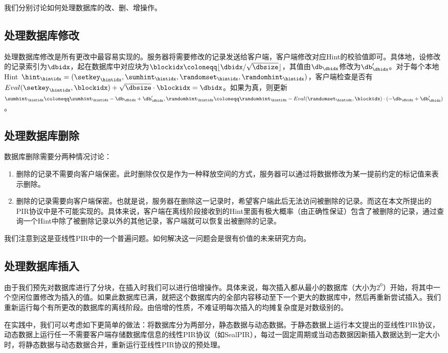 我们分别讨论如何处理数据库的改、删、增操作。

\subsection{处理数据库修改}
处理数据库修改是所有更改中最容易实现的。服务器将需要修改的记录发送给客户端，客户端修改对应Hint的校验值即可。具体地，设修改的记录索引为$\dbidx$，起在数据库中对应块为$\blockidx\coloneqq \lfloor \dbidx/\sqrt{\dbsize}\rfloor$，其值由$\db_\dbidx$修改为$\db_\dbidx'$。对于每个本地Hint $\hint_\hintidx = (\setkey_\hintidx,\sumhint_\hintidx,\randomset_\hintidx,\randomhint_\hintidx)$，客户端检查是否有 $Eval(\setkey_\hintidx, \blockidx) + \sqrt{\dbsize}\cdot \blockidx = \dbidx $。如果为真，则更新$\sumhint_\hintidx \coloneqq \sumhint_\hintidx - \db_{\dbidx} + \db_{\dbidx}', \randomhint_\hintidx \coloneqq \randomhint_\hintidx - Eval(\randomset_\hintidx,\blockidx)\cdot(-\db_{\dbidx} + \db_{\dbidx}')$。

\subsection{处理数据库删除}
数据库删除需要分两种情况讨论：
\begin{enumerate}
    \item 删除的记录不需要向客户端保密。此时删除仅仅是作为一种释放空间的方式，服务器可以通过将数据修改为某一提前约定的标记值来表示删除。
    \item 删除的记录需要向客户端保密。也就是说，服务器在删除这一记录时，希望客户端此后无法访问被删除的记录。而这在本文所提出的PIR协议中是不可能实现的。具体来说，客户端在离线阶段接收到的Hint里面有极大概率（由正确性保证）包含了被删除的记录，通过查询一个Hint中除了被删除记录以外的其他记录，客户端就可以恢复出被删除的记录。
\end{enumerate}

我们注意到这是亚线性PIR中的一个普遍问题。如何解决这一问题会是很有价值的未来研究方向。

\subsection{处理数据库插入}
由于我们预先对数据库进行了分块，在插入时我们可以进行倍增操作。具体来说，每次插入都从最小的数据库（大小为$2^0$）开始，将其中一个空闲位置修改为插入的值。如果此数据库已满，就把这个数据库内的全部内容移动至下一个更大的数据库中，然后再重新尝试插入。我们重新运行每个有所更改的数据库的离线阶段。由倍增的性质，不难证明每次插入的均摊复杂度是对数级别的。

在实践中，我们可以考虑如下更简单的做法：将数据库分为两部分，静态数据与动态数据。于静态数据上运行本文提出的亚线性PIR协议，动态数据上运行任一不需要客户端存储数据库信息的线性PIR协议（如SealPIR\cite{SP:ACLS18}），每过一固定周期或当动态数据因新插入数据达到一定大小时，将静态数据与动态数据合并，重新运行亚线性PIR协议的预处理。